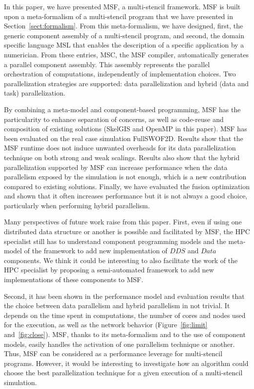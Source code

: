 In this paper, we have presented MSF, a multi-stencil framework.
MSF is built upon a meta-formalism of a multi-stencil program that we have presented in Section~\ref{sect:formalism}.
From this meta-formalism, we have designed, first, the generic component assembly of a multi-stencil program, and second, the domain specific language MSL that enables the description of a specific application by a numerician.
From these entries, MSC, the MSF compiler, automatically generates a parallel component assembly.
This assembly represents the parallel orchestration of computations, independently of implementation choices. Two parallelization strategies are supported: data parallelization and hybrid (data and task) parallelization.

By combining a meta-model and component-based programming, MSF has the particularity to enhance separation of concerns, as well as code-reuse and composition of existing solutions (\eg SkelGIS and OpenMP in this paper).
MSF has been evaluated on the real case simulation FullSWOF2D.
Results show that the MSF runtime does not induce unwanted overheads for its data parallelization technique on both strong and weak scalings.
Results also show that the hybrid parallelization supported by MSF can increase performance when the data parallelism exposed by the simulation is not enough, which is a new contribution compared to existing solutions.
Finally, we have evaluated the fusion optimization and shown that it often increases performance but it is not always a good choice, particularly when performing hybrid parallelism.

Many perspectives of future work raise from this paper. First, even if using one distributed data structure or another is possible and facilitated by MSF, the HPC specialist still has to understand component programming models and the meta-model of the framework to add new implementation of $DDS$ and $Data$ components. We think it could be interesting to also facilitate the work of the HPC specialist by proposing a semi-automated framework to add new implementations of these components to MSF.

Second, it has been shown in the performance model and evaluation results that the choice between data parallelism and hybrid parallelism in not trivial. It depends on the time spent in computations, the number of cores and nodes used for the execution, as well as the network behavior (Figure~\ref{fig:limit} and~\ref{fig:close}). MSF, thanks to its meta-formalism and to the use of component models, easily handles the activation of one parallelism technique or another. Thus, MSF can be considered as a performance leverage for multi-stencil programs. However, it would be interesting to investigate how an algorithm could choose the best parallelization technique for a given execution of a multi-stencil simulation.

